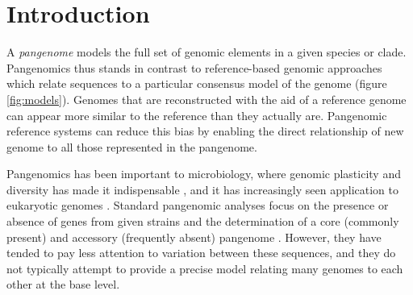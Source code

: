 \section{Introduction}  
\label{sec:intro}

A \emph{pangenome} models the full set of genomic elements in a given species or clade.
Pangenomics thus stands in contrast to reference-based genomic approaches which relate sequences to a particular consensus model of the genome (figure \ref{fig:models}).
Genomes that are reconstructed with the aid of a reference genome can appear more similar to the reference than they actually are.
Pangenomic reference systems can reduce this bias by enabling the direct relationship of new genome to all those represented in the pangenome.




Pangenomics has been important to microbiology, where genomic plasticity and diversity has made it indispensable \cite{Vernikos2015}, and it has increasingly seen application to eukaryotic genomes \cite{cao2011whole,gao2019tomato,Ou_2018}.
Standard pangenomic analyses focus on the presence or absence of genes from given strains and the determination of a core (commonly present) and accessory (frequently absent) pangenome \cite{page2015roary}.
However, they have tended to pay less attention to variation between these sequences, and they do not typically attempt to provide a precise model relating many genomes to each other at the base level.


